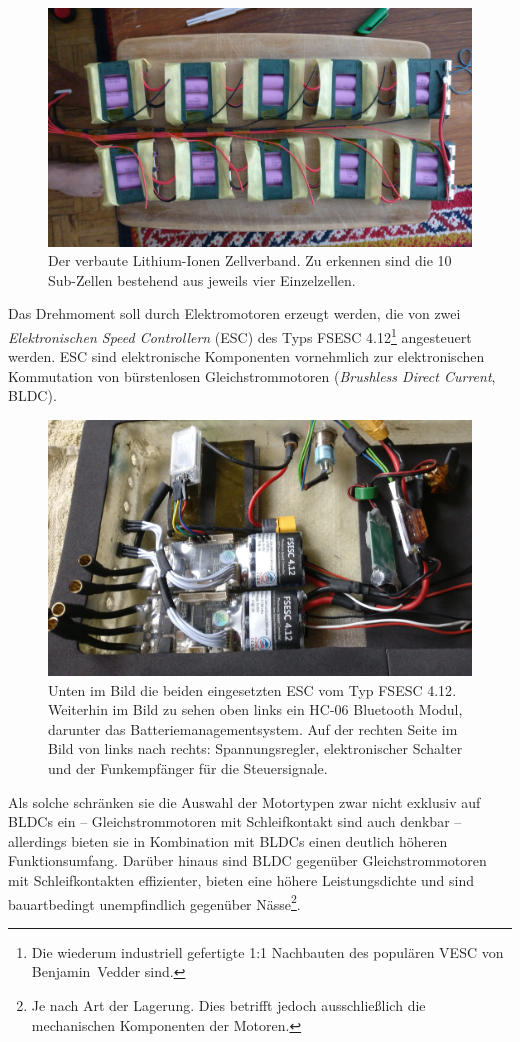 			\begin{figure}[h]
				\centering
				\includegraphics[width=.9\textwidth]{Footage/Pictures/Battery pack.jpg}
				\caption[Der verbaute Lithium-Ionen Zellverband]{Der verbaute Lithium-Ionen Zellverband. Zu erkennen sind die 10 Sub-Zellen bestehend aus jeweils vier Einzelzellen.}\label{fig:battery pack}
			\end{figure}\par
			Das Drehmoment soll durch Elektromotoren erzeugt werden, die von zwei \textit{Elektronischen Speed Controllern} (ESC) des Typs \textsc{FSESC 4.12}\footnote{Die wiederum industriell gefertigte 1:1 Nachbauten des populären \textsc{VESC} von Benjamin~Vedder sind.} angesteuert werden.
			ESC sind elektronische Komponenten vornehmlich zur elektronischen Kommutation von bürstenlosen Gleichstrommotoren (\textit{Brushless Direct Current}, BLDC).
			\begin{figure}[h]
				\centering
				\includegraphics[width=.9\textwidth]{Footage/Pictures/Electronics.jpg}
				\caption[Eingesetzte ESC]{Unten im Bild die beiden eingesetzten ESC vom Typ \textsc{FSESC 4.12}. Weiterhin im Bild zu sehen oben links ein HC-06 Bluetooth Modul, darunter das Batteriemanagementsystem. Auf der rechten Seite im Bild von links nach rechts: Spannungsregler, elektronischer Schalter und der Funkempfänger für die Steuersignale.}\label{fig:electronics}
			\end{figure}
			Als solche schränken sie die Auswahl der Motortypen zwar nicht exklusiv auf BLDCs ein -- Gleichstrommotoren mit Schleifkontakt sind auch denkbar -- allerdings bieten sie in Kombination mit BLDCs einen deutlich höheren Funktionsumfang.
			Darüber hinaus sind BLDC gegenüber Gleichstrommotoren mit Schleifkontakten effizienter, bieten eine höhere Leistungsdichte und sind bauartbedingt unempfindlich gegenüber Nässe\footnote{Je nach Art der Lagerung. Dies betrifft jedoch ausschließlich die mechanischen Komponenten der Motoren.}.

